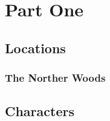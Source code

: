 \documentclass{report}
\newif\ifdm
\newcommand{\dmonly}[1]{\ifdm { \color{red} #1 } \else { } \fi}
\begin{document}
  \dmonly{ {\LARGE DM COPY} }

  \tableofcontents

  \part{Part One}

  \chapter{Locations}\label{ch:locations}

  \section{The Norther Woods}\label{sec:theNortherWoods}


  \chapter{Characters}\label{ch:characters}
\end{document}
